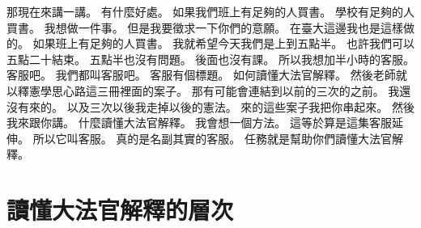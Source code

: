 \hypertarget{c01:cue:110}{}那現在來講一講。
\hypertarget{c01:cue:111}{}有什麼好處。
\hypertarget{c01:cue:112}{}如果我們班上有足夠的人買書。
\hypertarget{c01:cue:113}{}學校有足夠的人買書。
\hypertarget{c01:cue:114}{}我想做一件事。
\hypertarget{c01:cue:115}{}但是我要徵求一下你們的意願。
\hypertarget{c01:cue:116}{}在臺大這邊我也是這樣做的。
\hypertarget{c01:cue:117}{}如果班上有足夠的人買書。
\hypertarget{c01:cue:118}{}我就希望今天我們是上到五點半。
\hypertarget{c01:cue:119}{}也許我們可以五點二十結束。
\hypertarget{c01:cue:120}{}五點半也沒有問題。
\hypertarget{c01:cue:121}{}後面也沒有課。
\hypertarget{c01:cue:122}{}所以我想加半小時的客服。
\hypertarget{c01:cue:123}{}客服吧。
\hypertarget{c01:cue:124}{}我們都叫客服吧。
\hypertarget{c01:cue:125}{}客服有個標題。
\hypertarget{c01:cue:126}{}如何讀懂大法官解釋。
\hypertarget{c01:cue:127}{}然後老師就以釋憲學思心路這三冊裡面的案子。
\hypertarget{c01:cue:128}{}那有可能會連結到以前的三次的之前。
\hypertarget{c01:cue:129}{}我還沒有來的。
\hypertarget{c01:cue:130}{}以及三次以後我走掉以後的憲法。
\hypertarget{c01:cue:131}{}來的這些案子我把你串起來。
\hypertarget{c01:cue:132}{}然後我來跟你講。
\hypertarget{c01:cue:133}{}什麼讀懂大法官解釋。
\hypertarget{c01:cue:134}{}我會想一個方法。
\hypertarget{c01:cue:135}{}這等於算是這集客服延伸。
\hypertarget{c01:cue:136}{}所以它叫客服。
\hypertarget{c01:cue:137}{}真的是名副其實的客服。
\hypertarget{c01:cue:138}{}任務就是幫助你們讀懂大法官解釋。

\section{讀懂大法官解釋的層次}

